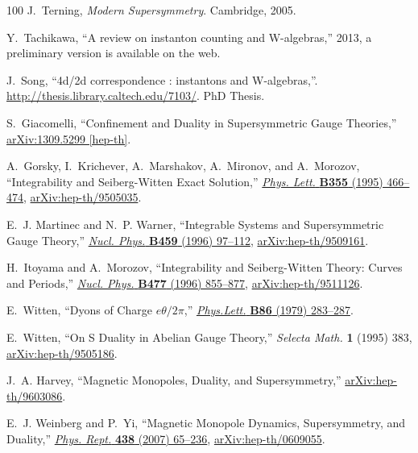 \begin{thebibliography}{100}
J.~Terning, {\em Modern Supersymmetry}.
\newblock Cambridge, 2005.

Y.~Tachikawa, ``A review on instanton counting and {W}-algebras,'' 2013, a preliminary version is available on the web.

J.~Song, ``{4d/2d correspondence : instantons and W-algebras},''.
\url{http://thesis.library.caltech.edu/7103/}. PhD Thesis.

S.~Giacomelli, ``{Confinement and Duality in Supersymmetric Gauge Theories},''
\href{http://arxiv.org/abs/1309.5299}{{\ttfamily arXiv:1309.5299 [hep-th]}}.

A.~Gorsky, I.~Krichever, A.~Marshakov, A.~Mironov, and A.~Morozov, ``{Integrability and Seiberg-Witten Exact Solution},''
\href{http://dx.doi.org/10.1016/0370-2693(95)00723-X}{{\em Phys. Lett.} {\bfseries B355} (1995) 466--474},
\href{http://arxiv.org/abs/hep-th/9505035}{{\ttfamily arXiv:hep-th/9505035}}.

E.~J. Martinec and N.~P. Warner, ``{Integrable Systems and Supersymmetric Gauge Theory},''
\href{http://dx.doi.org/10.1016/0550-3213(95)00588-9}{{\em Nucl. Phys.} {\bfseries B459} (1996) 97--112},
\href{http://arxiv.org/abs/hep-th/9509161}{{\ttfamily arXiv:hep-th/9509161}}.

H.~Itoyama and A.~Morozov, ``{Integrability and Seiberg-Witten Theory: Curves and Periods},''
\href{http://dx.doi.org/10.1016/0550-3213(96)00358-6}{{\em Nucl. Phys.} {\bfseries B477} (1996) 855--877},
\href{http://arxiv.org/abs/hep-th/9511126}{{\ttfamily arXiv:hep-th/9511126}}.

E.~Witten, ``{Dyons of Charge $e\theta/2\pi$},''
\href{http://dx.doi.org/10.1016/0370-2693(79)90838-4}{{\em Phys.Lett.} {\bfseries B86} (1979) 283--287}.

E.~Witten, ``{On S Duality in Abelian Gauge Theory},'' {\em Selecta Math.} {\bfseries 1} (1995) 383,
\href{http://arxiv.org/abs/hep-th/9505186}{{\ttfamily arXiv:hep-th/9505186}}.

J.~A. Harvey, ``{Magnetic Monopoles, Duality, and Supersymmetry},''
\href{http://arxiv.org/abs/hep-th/9603086}{{\ttfamily arXiv:hep-th/9603086}}.

E.~J. Weinberg and P.~Yi, ``{Magnetic Monopole Dynamics, Supersymmetry, and Duality},''
\href{http://dx.doi.org/10.1016/j.physrep.2006.11.002}{{\em Phys. Rept.} {\bfseries 438} (2007) 65--236},
\href{http://arxiv.org/abs/hep-th/0609055}{{\ttfamily arXiv:hep-th/0609055}}.


\end{thebibliography}
